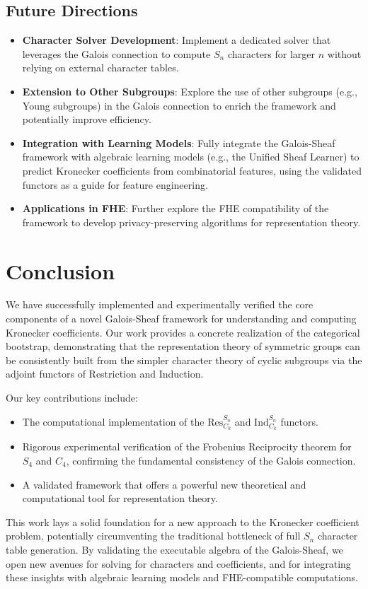 \documentclass[11pt]{article}
\theoremstyle{definition}
\theoremstyle{remark}
\begin{document}
\subsection{Future Directions}
\begin{itemize}
    \item \textbf{Character Solver Development}: Implement a dedicated solver that leverages the Galois connection to compute $S_n$ characters for larger $n$ without relying on external character tables.
    \item \textbf{Extension to Other Subgroups}: Explore the use of other subgroups (e.g., Young subgroups) in the Galois connection to enrich the framework and potentially improve efficiency.
    \item \textbf{Integration with Learning Models}: Fully integrate the Galois-Sheaf framework with algebraic learning models (e.g., the Unified Sheaf Learner) to predict Kronecker coefficients from combinatorial features, using the validated functors as a guide for feature engineering.
    \item \textbf{Applications in FHE}: Further explore the FHE compatibility of the framework to develop privacy-preserving algorithms for representation theory.
\end{itemize}

\section{Conclusion}

We have successfully implemented and experimentally verified the core components of a novel Galois-Sheaf framework for understanding and computing Kronecker coefficients. Our work provides a concrete realization of the categorical bootstrap, demonstrating that the representation theory of symmetric groups can be consistently built from the simpler character theory of cyclic subgroups via the adjoint functors of Restriction and Induction.

Our key contributions include:
\begin{itemize}
    \item The computational implementation of the $\text{Res}^{S_n}_{C_k}$ and $\text{Ind}_{C_k}^{S_n}$ functors.
    \item Rigorous experimental verification of the Frobenius Reciprocity theorem for $S_4$ and $C_4$, confirming the fundamental consistency of the Galois connection.
    \item A validated framework that offers a powerful new theoretical and computational tool for representation theory.
\end{itemize}
This work lays a solid foundation for a new approach to the Kronecker coefficient problem, potentially circumventing the traditional bottleneck of full $S_n$ character table generation. By validating the executable algebra of the Galois-Sheaf, we open new avenues for solving for characters and coefficients, and for integrating these insights with algebraic learning models and FHE-compatible computations.
\end{document}
